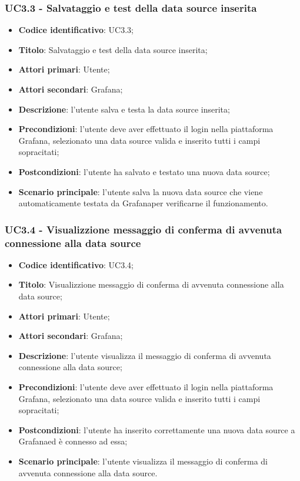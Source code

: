     \subsubsection{UC3.3 - Salvataggio e test della data source inserita}
        \begin{itemize}
            \item \textbf{Codice identificativo}: UC3.3;
            \item \textbf{Titolo}: Salvataggio e test della data source inserita;
            \item \textbf{Attori primari}: Utente;
            \item \textbf{Attori secondari}: Grafana\glo;
            \item \textbf{Descrizione}: l'utente salva e testa la data source inserita;
            \item \textbf{Precondizioni}: l'utente deve aver effettuato il login nella piattaforma Grafana\glo, selezionato una data source valida e inserito tutti i                                   campi sopracitati;
            \item \textbf{Postcondizioni}: l'utente ha salvato e testato una nuova data source;
            \item \textbf{Scenario principale}: l'utente salva la nuova data source che viene automaticamente testata da Grafana\glosp per verificarne il funzionamento.
        \end{itemize}
    \subsubsection{UC3.4 - Visualizzione messaggio di conferma di avvenuta connessione alla data source}
        \begin{itemize}
            \item \textbf{Codice identificativo}: UC3.4;
            \item \textbf{Titolo}: Visualizzione messaggio di conferma di avvenuta connessione alla data source;
            \item \textbf{Attori primari}: Utente;
            \item \textbf{Attori secondari}: Grafana\glo;
            \item \textbf{Descrizione}: l'utente visualizza il messaggio di conferma di avvenuta connessione alla data source;
            \item \textbf{Precondizioni}: l'utente deve aver effettuato il login nella piattaforma Grafana\glo, selezionato una data source valida e inserito tutti i                                   campi sopracitati;
            \item \textbf{Postcondizioni}: l'utente ha inserito correttamente una nuova data source a Grafana\glosp ed è connesso ad essa;
            \item \textbf{Scenario principale}: l'utente visualizza il messaggio di conferma di avvenuta connessione alla data source.
        \end{itemize}
